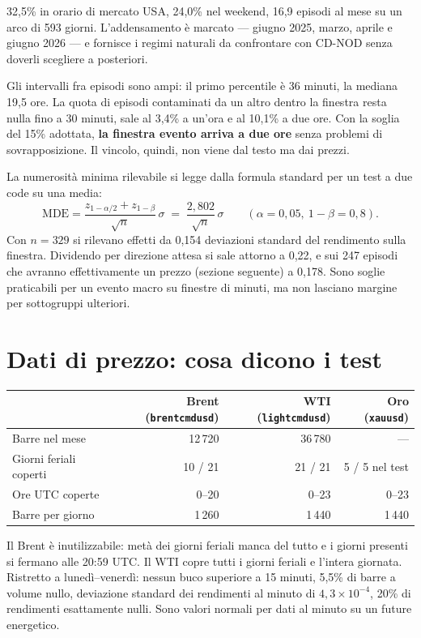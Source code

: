 \documentclass[11pt,a4paper]{article}
\begin{document}
32,5\% in orario di mercato USA, 24,0\% nel weekend, 16,9 episodi al mese su un arco di
593 giorni. L'addensamento è marcato — giugno 2025, marzo, aprile e giugno
2026 — e fornisce i regimi naturali da confrontare con CD-NOD senza doverli
scegliere a posteriori.

Gli intervalli fra episodi sono ampi: il primo percentile è 36 minuti, la
mediana 19,5 ore. La quota di episodi contaminati da un altro dentro la
finestra resta nulla fino a 30 minuti, sale al 3,4\% a un'ora e al 10,1\% a
due ore. Con la soglia del 15\% adottata, \textbf{la finestra evento arriva a
due ore} senza problemi di sovrapposizione. Il vincolo, quindi, non viene dal
testo ma dai prezzi.

La numerosità minima rilevabile si legge dalla formula standard per un test a
due code su una media:
\[
  \text{MDE} = \frac{z_{1-\alpha/2} + z_{1-\beta}}{\sqrt{n}}\,\sigma
  \;=\; \frac{2{,}802}{\sqrt{n}}\,\sigma
  \qquad (\alpha = 0{,}05,\ 1-\beta = 0{,}8).
\]
Con $n = 329$ si rilevano effetti da 0,154 deviazioni standard del rendimento
sulla finestra. Dividendo per direzione attesa si sale attorno a 0,22, e sui
247 episodi che avranno effettivamente un prezzo (sezione seguente) a 0,178.
Sono soglie praticabili per un evento macro su finestre di minuti, ma non
lasciano margine per sottogruppi ulteriori.

\section{Dati di prezzo: cosa dicono i test}

\begin{center}
\begin{tabular}{lrrr}
\toprule
& Brent (\texttt{brentcmdusd}) & WTI (\texttt{lightcmdusd}) & Oro (\texttt{xauusd}) \\
\midrule
Barre nel mese          & 12\,720 & 36\,780 & --- \\
Giorni feriali coperti  & 10 / 21 & 21 / 21 & 5 / 5 nel test \\
Ore UTC coperte         & 0--20   & 0--23   & 0--23 \\
Barre per giorno        & 1\,260  & 1\,440  & 1\,440 \\
\bottomrule
\end{tabular}
\end{center}

Il Brent è inutilizzabile: metà dei giorni feriali manca del tutto e i giorni
presenti si fermano alle 20:59 UTC. Il WTI copre tutti i giorni feriali e
l'intera giornata. Ristretto a lunedì--venerdì: nessun buco superiore a 15
minuti, 5,5\% di barre a volume nullo, deviazione standard dei rendimenti al
minuto di $4{,}3 \times 10^{-4}$, 20\% di rendimenti esattamente nulli. Sono
valori normali per dati al minuto su un future energetico.
\end{document}
